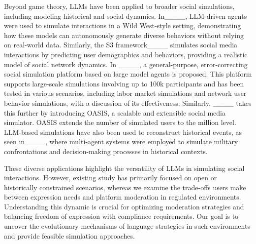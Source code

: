 Beyond game theory, LLMs have been applied to broader social simulations, including modeling historical and social dynamics. In____, LLM-driven agents were used to simulate interactions in a Wild West-style setting, demonstrating how these models can autonomously generate diverse behaviors without relying on real-world data. Similarly, the S3 framework____ simulates social media interactions by predicting user demographics and behaviors, providing a realistic model of social network dynamics. 
In ____, a general-purpose, error-correcting social simulation platform based on large model agents is proposed. This platform supports large-scale simulations involving up to 100k participants and has been tested in various scenarios, including labor market simulations and network user behavior simulations, with a discussion of its effectiveness.
Similarly, ____ takes this further by introducing OASIS, a scalable and extensible social media simulator. OASIS extends the number of simulated users to the million level.
LLM-based simulations have also been used to reconstruct historical events, as seen in____, where multi-agent systems were employed to simulate military confrontations and decision-making processes in historical contexts.

These diverse applications highlight the versatility of LLMs in simulating social interactions. However, existing study has primarily focused on open or historically constrained scenarios, whereas we examine the trade-offs users make between expression needs and platform moderation in regulated environments. Understanding this dynamic is crucial for optimizing moderation strategies and balancing freedom of expression with compliance requirements. Our goal is to uncover the evolutionary mechanisms of language strategies in such environments and provide feasible simulation approaches.



